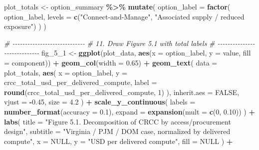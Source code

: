 \documentclass[
]{article}
\newenvironment{Shaded}{\begin{snugshade}}{\end{snugshade}}
\newcommand{\AttributeTok}[1]{\textcolor[rgb]{0.13,0.29,0.53}{#1}}
\newcommand{\CommentTok}[1]{\textcolor[rgb]{0.56,0.35,0.01}{\textit{#1}}}
\newcommand{\ConstantTok}[1]{\textcolor[rgb]{0.56,0.35,0.01}{#1}}
\newcommand{\DecValTok}[1]{\textcolor[rgb]{0.00,0.00,0.81}{#1}}
\newcommand{\FloatTok}[1]{\textcolor[rgb]{0.00,0.00,0.81}{#1}}
\newcommand{\FunctionTok}[1]{\textcolor[rgb]{0.13,0.29,0.53}{\textbf{#1}}}
\newcommand{\NormalTok}[1]{#1}
\newcommand{\OtherTok}[1]{\textcolor[rgb]{0.56,0.35,0.01}{#1}}
\newcommand{\SpecialCharTok}[1]{\textcolor[rgb]{0.81,0.36,0.00}{\textbf{#1}}}
\newcommand{\StringTok}[1]{\textcolor[rgb]{0.31,0.60,0.02}{#1}}
\begin{document}
\begin{Shaded}
\begin{Highlighting}[]
\NormalTok{plot\_totals }\OtherTok{\textless{}{-}}\NormalTok{ option\_summary }\SpecialCharTok{\%\textgreater{}\%}
  \FunctionTok{mutate}\NormalTok{(}
    \AttributeTok{option\_label =} \FunctionTok{factor}\NormalTok{(}
\NormalTok{      option\_label,}
      \AttributeTok{levels =} \FunctionTok{c}\NormalTok{(}\StringTok{"Connect{-}and{-}Manage"}\NormalTok{, }\StringTok{"Associated supply / reduced exposure"}\NormalTok{)}
\NormalTok{    )}
\NormalTok{  )}

\CommentTok{\# {-}{-}{-}{-}{-}{-}{-}{-}{-}{-}{-}{-}{-}{-}{-}{-}{-}{-}{-}{-}{-}{-}{-}{-}{-}{-}{-}{-}{-}}
\CommentTok{\# 11. Draw Figure 5.1 with total labels}
\CommentTok{\# {-}{-}{-}{-}{-}{-}{-}{-}{-}{-}{-}{-}{-}{-}{-}{-}{-}{-}{-}{-}{-}{-}{-}{-}{-}{-}{-}{-}{-}}
\NormalTok{fig\_5\_1 }\OtherTok{\textless{}{-}} \FunctionTok{ggplot}\NormalTok{(plot\_data, }\FunctionTok{aes}\NormalTok{(}\AttributeTok{x =}\NormalTok{ option\_label, }\AttributeTok{y =}\NormalTok{ value, }\AttributeTok{fill =}\NormalTok{ component)) }\SpecialCharTok{+}
  \FunctionTok{geom\_col}\NormalTok{(}\AttributeTok{width =} \FloatTok{0.65}\NormalTok{) }\SpecialCharTok{+}
  \FunctionTok{geom\_text}\NormalTok{(}
    \AttributeTok{data =}\NormalTok{ plot\_totals,}
    \FunctionTok{aes}\NormalTok{(}
      \AttributeTok{x =}\NormalTok{ option\_label,}
      \AttributeTok{y =}\NormalTok{ crcc\_total\_usd\_per\_delivered\_compute,}
      \AttributeTok{label =} \FunctionTok{round}\NormalTok{(crcc\_total\_usd\_per\_delivered\_compute, }\DecValTok{1}\NormalTok{)}
\NormalTok{    ),}
    \AttributeTok{inherit.aes =} \ConstantTok{FALSE}\NormalTok{,}
    \AttributeTok{vjust =} \SpecialCharTok{{-}}\FloatTok{0.45}\NormalTok{,}
    \AttributeTok{size =} \FloatTok{4.2}
\NormalTok{  ) }\SpecialCharTok{+}
  \FunctionTok{scale\_y\_continuous}\NormalTok{(}
    \AttributeTok{labels =} \FunctionTok{number\_format}\NormalTok{(}\AttributeTok{accuracy =} \FloatTok{0.1}\NormalTok{),}
    \AttributeTok{expand =} \FunctionTok{expansion}\NormalTok{(}\AttributeTok{mult =} \FunctionTok{c}\NormalTok{(}\DecValTok{0}\NormalTok{, }\FloatTok{0.10}\NormalTok{))}
\NormalTok{  ) }\SpecialCharTok{+}
  \FunctionTok{labs}\NormalTok{(}
    \AttributeTok{title =} \StringTok{"Figure 5.1. Decomposition of CRCC by access/procurement design"}\NormalTok{,}
    \AttributeTok{subtitle =} \StringTok{"Virginia / PJM / DOM case, normalized by delivered compute"}\NormalTok{,}
    \AttributeTok{x =} \ConstantTok{NULL}\NormalTok{,}
    \AttributeTok{y =} \StringTok{"USD per delivered compute"}\NormalTok{,}
    \AttributeTok{fill =} \ConstantTok{NULL}
\NormalTok{  ) }\SpecialCharTok{+}

\end{Highlighting}
\end{Shaded}
\end{document}

